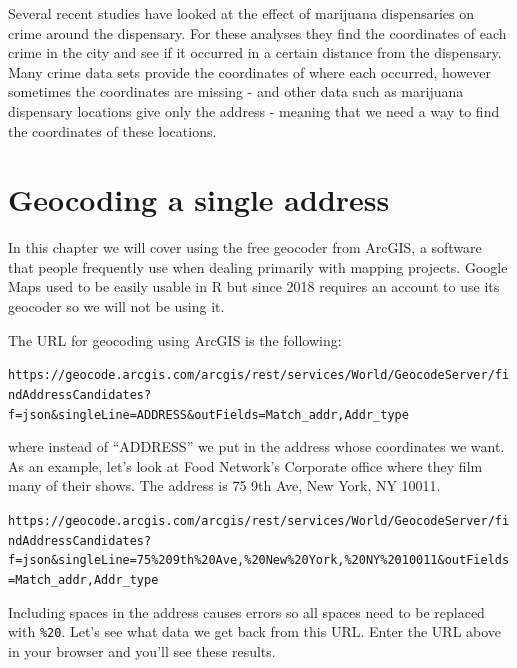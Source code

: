 \documentclass[
  12pt,
]{book}
\begin{document}
Several recent studies have looked at the effect of marijuana dispensaries on crime around the dispensary. For these analyses they find the coordinates of each crime in the city and see if it occurred in a certain distance from the dispensary. Many crime data sets provide the coordinates of where each occurred, however sometimes the coordinates are missing - and other data such as marijuana dispensary locations give only the address - meaning that we need a way to find the coordinates of these locations.

\hypertarget{geocoding-a-single-address}{%
\section{Geocoding a single address}\label{geocoding-a-single-address}}

In this chapter we will cover using the free geocoder from ArcGIS, a software that people frequently use when dealing primarily with mapping projects. Google Maps used to be easily usable in R but since 2018 requires an account to use its geocoder so we will not be using it.

The URL for geocoding using ArcGIS is the following:

\texttt{https://geocode.arcgis.com/arcgis/rest/services/World/GeocodeServer/findAddressCandidates?f=json\&singleLine=ADDRESS\&outFields=Match\_addr,Addr\_type}

where instead of ``ADDRESS'' we put in the address whose coordinates we want. As an example, let's look at Food Network's Corporate office where they film many of their shows. The address is 75 9th Ave, New York, NY 10011.

\texttt{https://geocode.arcgis.com/arcgis/rest/services/World/GeocodeServer/findAddressCandidates?f=json\&singleLine=75\%209th\%20Ave,\%20New\%20York,\%20NY\%2010011\&outFields=Match\_addr,Addr\_type}

Including spaces in the address causes errors so all spaces need to be replaced with \texttt{\%20}. Let's see what data we get back from this URL. Enter the URL above in your browser and you'll see these results.
\end{document}
